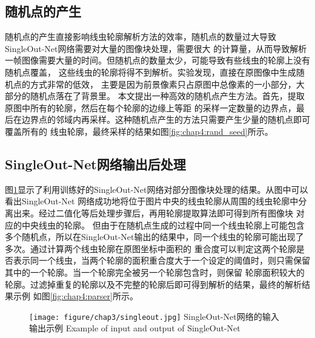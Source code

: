 \subsection{随机点的产生}
	随机点的产生直接影响线虫轮廓解析方法的效率，随机点的数量过大导致SingleOut-Net网络需要对大量的图像块处理，需要很大
	的计算量，从而导致解析一帧图像需要大量的时间。但随机点的数量太少，可能导致有些线虫的轮廓上没有随机点覆盖，
	这些线虫的轮廓将得不到解析。实验发现，直接在原图像中生成随机点的方式非常的低效，
	主要是因为前景像素只占原图中总像素的一小部分，大部分的随机点落在了背景里。
	本文提出一种高效的随机点产生方法。首先，提取原图中所有的轮廓，然后在每个轮廓的边缘上等距
	的采样一定数量的边界点，最后在边界点的邻域内再采样。这种随机点产生的方法只需要产生少量的随机点即可覆盖所有的
	线虫轮廓，最终采样的结果如图\ref{fig:chap4:rand_seed}所示。

\subsection{SingleOut-Net网络输出后处理}
	图\ref{fig:chap4:singleout}显示了利用训练好的SingleOut-Net网络对部分图像块处理的结果。从图中可以看出SingleOut-Net
	网络成功地将位于图片中央的线虫轮廓从周围的线虫轮廓中分离出来。经过二值化等后处理步骤后，再用轮廓提取算法即可得到所有图像块
	对应的中央线虫的轮廓。
	但由于在随机点生成的过程中同一个线虫轮廓上可能包含
	多个随机点，所以在SingleOut-Net输出的结果中，同一个线虫的轮廓可能出现了多次。通过计算两个线虫轮廓在原图坐标中面积的
	重合度可以判定这两个轮廓是否表示同一个线虫，当两个轮廓的面积重合度大于一个设定的阈值时，则只需保留其中的一个轮廓。当一个轮廓完全被另一个轮廓包含时，则保留
	轮廓面积较大的轮廓。过滤掉重复的轮廓以及不完整的轮廓后即可得到解析的结果，最终的解析结果示例
	如图\ref{fig:chap4:parser}所示。
	\begin{figure}[!h]
	  \centering
	  \texttt{[image: figure/chap3/singleout.jpg]}
	  \bicaption
		{SingleOut-Net网络的输入输出示例}
		{Example of input and output of SingleOut-Net}
	  \label{fig:chap4:singleout}
	\end{figure}

